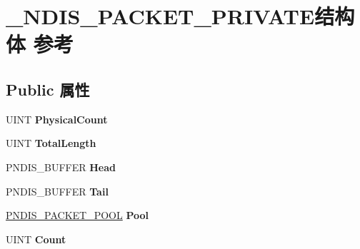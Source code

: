 \hypertarget{struct___n_d_i_s___p_a_c_k_e_t___p_r_i_v_a_t_e}{}\section{\+\_\+\+N\+D\+I\+S\+\_\+\+P\+A\+C\+K\+E\+T\+\_\+\+P\+R\+I\+V\+A\+T\+E结构体 参考}
\label{struct___n_d_i_s___p_a_c_k_e_t___p_r_i_v_a_t_e}
\subsection*{Public 属性}
\begin{DoxyCompactItemize}
\item 
\mbox{\label{struct___n_d_i_s___p_a_c_k_e_t___p_r_i_v_a_t_e_a2d05b8c454bc9595d34d806f9fdf06c3}} 
U\+I\+NT {\bfseries Physical\+Count}
\item 
\mbox{\label{struct___n_d_i_s___p_a_c_k_e_t___p_r_i_v_a_t_e_a72c1e30de76a760157bea22820482d5f}} 
U\+I\+NT {\bfseries Total\+Length}
\item 
\mbox{\label{struct___n_d_i_s___p_a_c_k_e_t___p_r_i_v_a_t_e_a6337d70e19993ab72f4c1e6849057915}} 
P\+N\+D\+I\+S\+\_\+\+B\+U\+F\+F\+ER {\bfseries Head}
\item 
\mbox{\label{struct___n_d_i_s___p_a_c_k_e_t___p_r_i_v_a_t_e_a051c9be894b80accd1fad79f93f6d1ee}} 
P\+N\+D\+I\+S\+\_\+\+B\+U\+F\+F\+ER {\bfseries Tail}
\item 
\mbox{\label{struct___n_d_i_s___p_a_c_k_e_t___p_r_i_v_a_t_e_aa3d03a7a6a7faf1deee05d535736d0a8}} 
\hyperlink{interfacevoid}{P\+N\+D\+I\+S\+\_\+\+P\+A\+C\+K\+E\+T\+\_\+\+P\+O\+OL} {\bfseries Pool}
\item 
\mbox{\label{struct___n_d_i_s___p_a_c_k_e_t___p_r_i_v_a_t_e_a8eca0224cfb9d6cad9f9428111e1857c}} 
U\+I\+NT {\bfseries Count}
\item 
\mbox{\label{struct___n_d_i_s___p_a_c_k_e_t___p_r_i_v_a_t_e_aeb075149a1e05fe1cfeb56c16497e4e5}} 

\end{DoxyCompactItemize}
